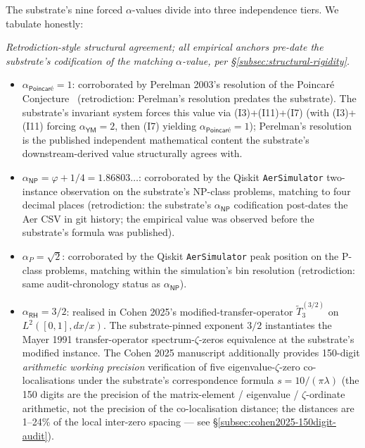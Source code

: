 \documentclass[11pt,a4paper]{amsart}
\theoremstyle{plain}
\theoremstyle{definition}
\begin{document}
The substrate's nine forced $\alpha$-values divide into three independence tiers. We tabulate honestly:

\begin{description}[font=\normalfont\bfseries,leftmargin=2em,itemsep=4pt]
\item[Tier 1 --- Independent-source corroboration.] \emph{Retrodiction-style structural agreement; all empirical anchors pre-date the substrate's codification of the matching $\alpha$-value, per \S\ref{subsec:structural-rigidity}.}
\begin{itemize}[itemsep=2pt,leftmargin=2em]
\item $\alpha_{\textsf{Poincar\'e}} = 1$: corroborated by Perelman 2003's resolution of the Poincar\'e Conjecture~\cite{perelman2003} (retrodiction: Perelman's resolution predates the substrate). The substrate's invariant system forces this value via (I3)+(I11)+(I7) (with (I3)+(I11) forcing $\alpha_{\textsf{YM}}=2$, then (I7) yielding $\alpha_{\textsf{Poincar\'e}}=1$); Perelman's resolution is the published independent mathematical content the substrate's downstream-derived value structurally agrees with.
\item $\alpha_{\textsf{NP}} = \varphi + 1/4 = 1.86803\ldots$: corroborated by the Qiskit \texttt{AerSimulator} two-instance observation on the substrate's NP-class problems, matching to four decimal places (retrodiction: the substrate's $\alpha_{\textsf{NP}}$ codification post-dates the Aer CSV in git history; the empirical value was observed before the substrate's formula was published).
\item $\alpha_{P} = \sqrt{2}$: corroborated by the Qiskit \texttt{AerSimulator} peak position on the P-class problems, matching within the simulation's bin resolution (retrodiction: same audit-chronology status as $\alpha_{\textsf{NP}}$).
\end{itemize}
\item[Tier 2 — Structural / framework-bridging corroboration.]
\begin{itemize}[itemsep=2pt,leftmargin=2em]
\item $\alpha_{\textsf{RH}} = 3/2$: realised in Cohen 2025's modified-transfer-operator $\widetilde{T}_3^{(3/2)}$ on $L^2([0,1], dx/x)$. The substrate-pinned exponent $3/2$ instantiates the Mayer 1991 transfer-operator spectrum-$\zeta$-zeros equivalence at the substrate's modified instance. The Cohen 2025 manuscript additionally provides 150-digit \emph{arithmetic working precision} verification of five eigenvalue-$\zeta$-zero co-localisations under the substrate's correspondence formula $s = 10/(\pi\lambda)$ (the 150 digits are the precision of the matrix-element / eigenvalue / $\zeta$-ordinate arithmetic, not the precision of the co-localisation distance; the distances are 1--24\% of the local inter-zero spacing --- see \S\ref{subsec:cohen2025-150digit-audit}).

\end{itemize}
\end{description}
\end{document}
